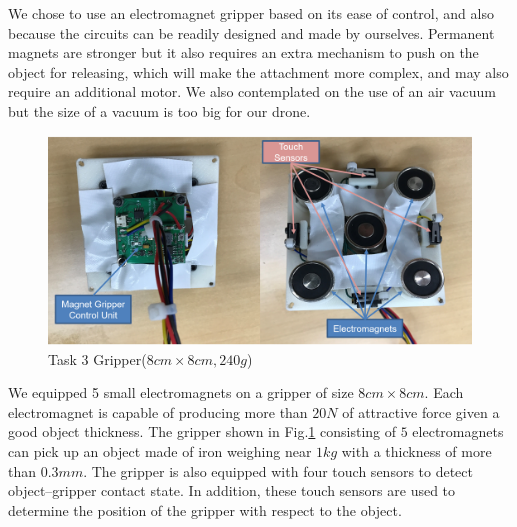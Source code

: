 \documentclass{standalone}
\begin{document}
We chose to use an electromagnet gripper based on its ease of control, and also because the circuits
can be readily designed and made by ourselves. Permanent magnets are stronger but it also
requires an extra mechanism to push on the object for releasing, which will
make the attachment more complex, and may also require an additional motor. We
also contemplated on the use of an air vacuum but the size of a vacuum is too
big for our drone.

 \begin{figure}[hb]
    \begin{center}
    \includegraphics[keepaspectratio=true, width=1\linewidth, height=0.3\textheight]
    {sections//task3//images//task3gripper.png}
      \end{center}
    \caption{Task 3 Gripper($8cm \times 8cm, 240g$)}
    \label{task3platform}
    \end{figure}

We equipped 5 small electromagnets on a gripper of size $8cm \times
8cm$. Each electromagnet is capable of producing more than $20 N$
of attractive force given a good object thickness. The gripper shown in
Fig.\ref{task3platform} consisting of $5$
electromagnets can pick up an object made of iron weighing near $1kg$ with a thickness of more than $0.3mm$.
The gripper is also equipped with four touch sensors to detect
object--gripper contact state. In addition,
these touch sensors are used to determine the position of the gripper
with respect to the object. 

\end{document}
